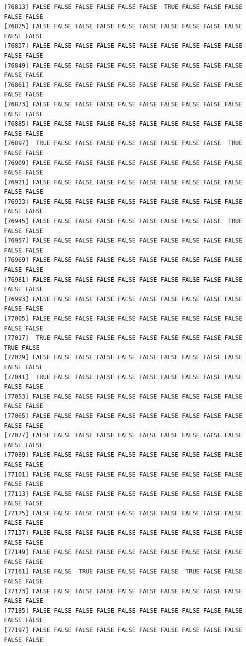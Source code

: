 \documentclass[
  a4paper,
  DIV=11,
  numbers=noendperiod]{scrartcl}
\begin{document}
\begin{verbatim}
[76813] FALSE FALSE FALSE FALSE FALSE FALSE  TRUE FALSE FALSE FALSE FALSE FALSE
[76825] FALSE FALSE FALSE FALSE FALSE FALSE FALSE FALSE FALSE FALSE FALSE FALSE
[76837] FALSE FALSE FALSE FALSE FALSE FALSE FALSE FALSE FALSE FALSE FALSE FALSE
[76849] FALSE FALSE FALSE FALSE FALSE FALSE FALSE FALSE FALSE FALSE FALSE FALSE
[76861] FALSE FALSE FALSE FALSE FALSE FALSE FALSE FALSE FALSE FALSE FALSE FALSE
[76873] FALSE FALSE FALSE FALSE FALSE FALSE FALSE FALSE FALSE FALSE FALSE FALSE
[76885] FALSE FALSE FALSE FALSE FALSE FALSE FALSE FALSE FALSE FALSE FALSE FALSE
[76897]  TRUE FALSE FALSE FALSE FALSE FALSE FALSE FALSE FALSE  TRUE FALSE FALSE
[76909] FALSE FALSE FALSE FALSE FALSE FALSE FALSE FALSE FALSE FALSE FALSE FALSE
[76921] FALSE FALSE FALSE FALSE FALSE FALSE FALSE FALSE FALSE FALSE FALSE FALSE
[76933] FALSE FALSE FALSE FALSE FALSE FALSE FALSE FALSE FALSE FALSE FALSE FALSE
[76945] FALSE FALSE FALSE FALSE FALSE FALSE FALSE FALSE FALSE  TRUE FALSE FALSE
[76957] FALSE FALSE FALSE FALSE FALSE FALSE FALSE FALSE FALSE FALSE FALSE FALSE
[76969] FALSE FALSE FALSE FALSE FALSE FALSE FALSE FALSE FALSE FALSE FALSE FALSE
[76981] FALSE FALSE FALSE FALSE FALSE FALSE FALSE FALSE FALSE FALSE FALSE FALSE
[76993] FALSE FALSE FALSE FALSE FALSE FALSE FALSE FALSE FALSE FALSE FALSE FALSE
[77005] FALSE FALSE FALSE FALSE FALSE FALSE FALSE FALSE FALSE FALSE FALSE FALSE
[77017]  TRUE FALSE FALSE FALSE FALSE FALSE FALSE FALSE FALSE FALSE  TRUE FALSE
[77029] FALSE FALSE FALSE FALSE FALSE FALSE FALSE FALSE FALSE FALSE FALSE FALSE
[77041]  TRUE FALSE FALSE FALSE FALSE FALSE FALSE FALSE FALSE FALSE FALSE FALSE
[77053] FALSE FALSE FALSE FALSE FALSE FALSE FALSE FALSE FALSE FALSE FALSE FALSE
[77065] FALSE FALSE FALSE FALSE FALSE FALSE FALSE FALSE FALSE FALSE FALSE FALSE
[77077] FALSE FALSE FALSE FALSE FALSE FALSE FALSE FALSE FALSE FALSE FALSE FALSE
[77089] FALSE FALSE FALSE FALSE FALSE FALSE FALSE FALSE FALSE FALSE FALSE FALSE
[77101] FALSE FALSE FALSE FALSE FALSE FALSE FALSE FALSE FALSE FALSE FALSE FALSE
[77113] FALSE FALSE FALSE FALSE FALSE FALSE FALSE FALSE FALSE FALSE FALSE FALSE
[77125] FALSE FALSE FALSE FALSE FALSE FALSE FALSE FALSE FALSE FALSE FALSE FALSE
[77137] FALSE FALSE FALSE FALSE FALSE FALSE FALSE FALSE FALSE FALSE FALSE FALSE
[77149] FALSE FALSE FALSE FALSE FALSE FALSE FALSE FALSE FALSE FALSE FALSE FALSE
[77161] FALSE FALSE  TRUE FALSE FALSE FALSE FALSE  TRUE FALSE FALSE FALSE FALSE
[77173] FALSE FALSE FALSE FALSE FALSE FALSE FALSE FALSE FALSE FALSE FALSE FALSE
[77185] FALSE FALSE FALSE FALSE FALSE FALSE FALSE FALSE FALSE FALSE FALSE FALSE
[77197] FALSE FALSE FALSE FALSE FALSE FALSE FALSE FALSE FALSE FALSE FALSE FALSE

\end{verbatim}
\end{document}
